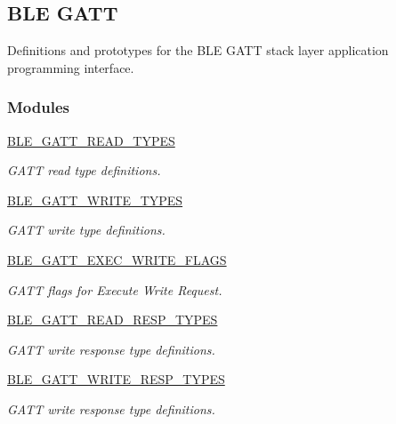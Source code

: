 \hypertarget{group___b_l_e___g_a_t_t}{}\subsection{B\+LE G\+A\+TT}
\label{group___b_l_e___g_a_t_t}


Definitions and prototypes for the B\+LE G\+A\+TT stack layer application programming interface.  


\subsubsection*{Modules}
\begin{DoxyCompactItemize}
\item 
\hyperlink{group___b_l_e___g_a_t_t___r_e_a_d___t_y_p_e_s}{B\+L\+E\+\_\+\+G\+A\+T\+T\+\_\+\+R\+E\+A\+D\+\_\+\+T\+Y\+P\+ES}
\begin{DoxyCompactList}\small\item\em G\+A\+TT read type definitions. \end{DoxyCompactList}\item 
\hyperlink{group___b_l_e___g_a_t_t___w_r_i_t_e___t_y_p_e_s}{B\+L\+E\+\_\+\+G\+A\+T\+T\+\_\+\+W\+R\+I\+T\+E\+\_\+\+T\+Y\+P\+ES}
\begin{DoxyCompactList}\small\item\em G\+A\+TT write type definitions. \end{DoxyCompactList}\item 
\hyperlink{group___b_l_e___g_a_t_t___e_x_e_c___w_r_i_t_e___f_l_a_g_s}{B\+L\+E\+\_\+\+G\+A\+T\+T\+\_\+\+E\+X\+E\+C\+\_\+\+W\+R\+I\+T\+E\+\_\+\+F\+L\+A\+GS}
\begin{DoxyCompactList}\small\item\em G\+A\+TT flags for Execute Write Request. \end{DoxyCompactList}\item 
\hyperlink{group___b_l_e___g_a_t_t___r_e_a_d___r_e_s_p___t_y_p_e_s}{B\+L\+E\+\_\+\+G\+A\+T\+T\+\_\+\+R\+E\+A\+D\+\_\+\+R\+E\+S\+P\+\_\+\+T\+Y\+P\+ES}
\begin{DoxyCompactList}\small\item\em G\+A\+TT write response type definitions. \end{DoxyCompactList}\item 
\hyperlink{group___b_l_e___g_a_t_t___w_r_i_t_e___r_e_s_p___t_y_p_e_s}{B\+L\+E\+\_\+\+G\+A\+T\+T\+\_\+\+W\+R\+I\+T\+E\+\_\+\+R\+E\+S\+P\+\_\+\+T\+Y\+P\+ES}
\begin{DoxyCompactList}\small\item\em G\+A\+TT write response type definitions. \end{DoxyCompactList}\item 

\end{DoxyCompactItemize}
